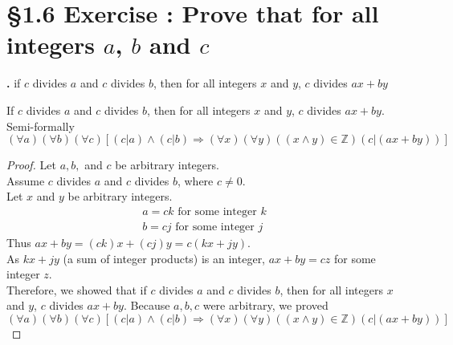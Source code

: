 \documentclass[a4paper,11pt]{article}
\begin{document}
\section*{\S 1.6 Exercise : Prove that for all integers \(a\), \(b\) and \(c\)}
\textbf{.}
if \(c\) divides \(a\) and \(c\) divides \(b\), then for all integers \(x\) and \(y\), \(c\) divides \(ax+by\)
\begin{theorem3}
If \(c\) divides \(a\) and \(c\) divides \(b\), then for all integers \(x\) and \(y\), \(c\) divides 
\(ax+by\).\\
Semi-formally \((\forall a)(\forall b)(\forall c)[(c|a)\wedge(c|b)\Rightarrow(\forall x)(\forall y)((x\wedge y)\in \mathbb{Z})(c|(ax+by))]\)
\begin{proof}
Let \(a, b,\) and \(c\) be arbitrary integers.\\
Assume \(c\) divides \(a\) and \(c\) divides \(b\), where \(c\neq 0\).\\
Let \(x\) and \(y\) be arbitrary integers.
\begin{gather*}
  a=ck \text{ for some integer } k&\\
  b=cj \text{ for some integer } j&
\end{gather*}
Thus \(ax+by=(ck)x + (cj)y = c(kx+jy)\).\\
As \(kx+jy\) (a sum of integer products) is an integer, \(ax+by=cz\) for some 
integer \(z\).\\
Therefore, we showed that if \(c\) divides \(a\) and \(c\) divides \(b\), then 
for all integers \(x\) and \(y\), \(c\) divides \(ax+by\). Because \(a, b, c\) 
were arbitrary, we proved \((\forall a)(\forall b)(\forall c)[(c|a)\wedge(c|b)\Rightarrow(\forall x)(\forall y)((x\wedge y)\in \mathbb{Z})(c|(ax+by))]\)
\end{proof}
\end{theorem3}

\newpage

\setcounter{ProblemCounter}{2}
\setcounter{SubsectionCounter}{5}
\end{document}
